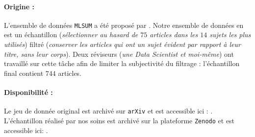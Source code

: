 		\paragraph{Origine :}
		L'ensemble de données \texttt{MLSUM} a été proposé par \cite{scialom-etal:2020:mlsum-multilingual-summarization}.
		Notre ensemble de données en est un échantillon (\textit{sélectionner au hasard de $75$ articles dans les $14$ sujets les plus utilisés}) filtré (\textit{conserver les articles qui ont un sujet évident par rapport à leur titre, sans leur corps}).
		Deux réviseurs (\textit{une Data Scientist et moi-même}) ont travaillé sur cette tâche afin de limiter la subjectivité du filtrage : l'échantillon final contient $744$ articles.
		
		\paragraph{Disponibilité :}
		Le jeu de donnée original est archivé sur \texttt{arXiv} et est accessible ici : \cite{scialom-etal:2020:mlsum-multilingual-summarization}.
		L'échantillon réalisé par nos soins est archivé sur la plateforme \texttt{Zenodo} et est accessible ici: \cite{schild-adler:2023:subset-mlsum-multilingual}.